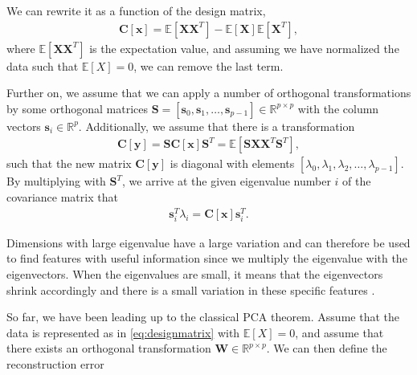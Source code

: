 \noindent We can rewrite it as a function of the design matrix,
\begin{align}
  \boldsymbol{C}[\boldsymbol{x}] = \mathbb{E}[\boldsymbol{X}\boldsymbol{X}^T] - \mathbb{E}[\boldsymbol{X}] \mathbb{E}[\boldsymbol{X}^T],
\end{align}
where $\mathbb{E}[\boldsymbol{X}\boldsymbol{X}^T]$ is the expectation value, and assuming we have normalized the data such that $\mathbb{E}[X] = 0$, we can remove the last term.

Further on, we assume that we can apply a number of orthogonal transformations by some orthogonal matrices $\boldsymbol{S}=[\boldsymbol{s}_0,\boldsymbol{s}_1,\dots,\boldsymbol{s}_{p-1}]\in {\mathbb{R}}^{p\times p}$ with the column vectors $\boldsymbol{s}_i \in {\mathbb{R}}^{p}$. Additionally, we assume that there is a transformation
\begin{align}
  \boldsymbol{C}[\boldsymbol{y}] =\boldsymbol{S}\boldsymbol{C}[\boldsymbol{x}]\boldsymbol{S}^T = \mathbb{E}[\boldsymbol{S}\boldsymbol{X}\boldsymbol{X}^T\boldsymbol{S}^T],
\end{align}
such that the new matrix $\boldsymbol{C}[\boldsymbol{y}]$ is diagonal with elements $[\lambda_0,\lambda_1,\lambda_2,\dots,\lambda_{p-1}]$. By multiplying with $\boldsymbol{S}^T$, we arrive at the given eigenvalue number $i$ of the covariance matrix that
\begin{align}
  \boldsymbol{s}^T_i\lambda_i = \boldsymbol{C}[\boldsymbol{x}]\boldsymbol{s}^T_i.
\end{align}

\noindent Dimensions with large eigenvalue have a large variation and can therefore be used to find features with useful information since we multiply the eigenvalue with the eigenvectors. When the eigenvalues are small, it means that the eigenvectors shrink accordingly and there is a small variation in these specific features \cite{Marsland2014}.

So far, we have been leading up to the classical PCA theorem. Assume that the data is represented as in \autoref{eq:designmatrix} with $\mathbb{E}[X]=0$, and assume that there exists an orthogonal transformation $\boldsymbol{W}\in {\mathbb{R}}^{p\times p}$. We can then define the reconstruction error


